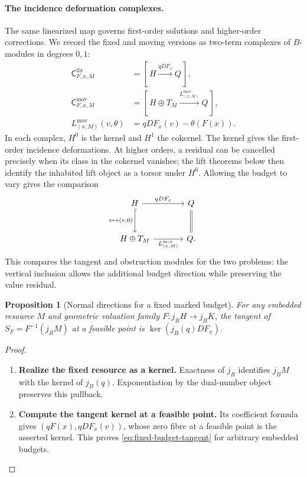 \documentclass[11pt,a4paper]{article}
\numberwithin{algorithm}{section}
\numberwithin{equation}{section}
\newtheorem{proposition}[proposition]{Proposition}
\theoremstyle{definition}
\theoremstyle{remark}
\theoremstyle{plain}
\newcommand{\DCx}{\mathsf{C}}
\theoremstyle{definition}
\theoremstyle{plain}
\begin{document}
\paragraph{The incidence deformation complexes.}
The same linearized map governs first-order solutions and
higher-order corrections. We record the fixed and moving
versions as two-term complexes of $B$-modules in degrees $0,1$:
\begin{equation}\label{eq:cat-incidence-complexes}
\begin{aligned}
 \DCx^{\mathrm{fix}}_{F,x,M}
   &= [\,H\xrightarrow{qDF_x}Q\,],\\
 \DCx^{\mathrm{mov}}_{F,x,M}
   &= [\,H\oplus T_M\xrightarrow{L^{\mathrm{mov}}_{(x,M)}}Q\,],\\
 L^{\mathrm{mov}}_{(x,M)}(v,\theta)
   &=qDF_x(v)-\theta(F(x)).
\end{aligned}
\end{equation}
In each complex, $H^0$ is the kernel and $H^1$ the cokernel.
The kernel gives the first-order incidence deformations.
At higher orders, a residual can be cancelled precisely when
its class in the cokernel vanishes; the lift theorems below
then identify the inhabited lift object as a torsor under
$H^0$. Allowing the budget to vary gives the comparison
\begin{equation}\label{eq:cat-fixed-moving-complex}
\begin{tikzcd}[column sep=large,row sep=large]
 H \arrow[r,"{qDF_x}"] \arrow[d,hook,"{v\mapsto(v,0)}"']
   & Q \arrow[d,equal]\\
 H\oplus T_M \arrow[r,"{L^{\mathrm{mov}}_{(x,M)}}"']
   & Q .
\end{tikzcd}
\end{equation}
This compares the tangent and obstruction modules for the
two problems: the vertical inclusion allows the additional
budget direction while preserving the value residual.


\begin{proposition}[Normal directions for a fixed marked budget]
\label{prop:normal}
For any embedded resource $M$ and geometric valuation family
$F:j_BH\to j_BK$, the tangent of $S_F=F^{-1}(j_BM)$ at a
feasible point is $\ker(j_B(q)DF_x)$.
\end{proposition}
\begin{proof}\leavevmode
\begin{enumerate}[leftmargin=*,align=left]
\item \textbf{Realize the fixed resource as a kernel.}
Exactness of $j_B$ identifies $j_BM$ with the kernel of $j_B(q)$.
Exponentiation by the dual-number object preserves this
pullback.

\item \textbf{Compute the tangent kernel at a feasible point.}
Its coefficient formula gives $(qF(x),qDF_x(v))$,
whose zero fibre at a feasible point is the asserted kernel.
This proves \eqref{eq:fixed-budget-tangent} for arbitrary embedded budgets.
\end{enumerate}
\end{proof}
\end{document}
